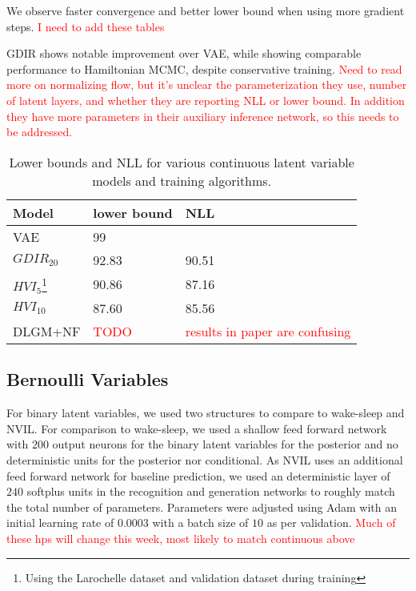 \documentclass{article} %
\newcommand{\alert}[1]{\textcolor{red}{#1}}
\begin{document}
We observe faster convergence and better lower bound when using more gradient steps. \alert{I need to add these tables}

GDIR shows notable improvement over VAE, while showing comparable performance to Hamiltonian MCMC, despite conservative training. \alert{Need to read more on normalizing flow, but it's unclear the parameterization they use, number of latent layers, and whether they are reporting NLL or lower bound. In addition they have more parameters in their auxiliary inference network, so this needs to be addressed.}

\begin{table}
\label{table:continuous}
\begin{tabular}{ | m{6em} | m{1cm}| m{5cm} | } 
\hline
Model & lower bound & NLL \\ 
\hline
\hline
VAE & 99 &  \\ 
\hline
$GDIR_{20}$ & 92.83 & 90.51 \\ 
\hline
\hline
$HVI_5$\footnote[1]{Using the Larochelle dataset and validation dataset during training} &  90.86 & 87.16 \\ 
$HVI_{10}$\footnote[1] & 87.60 & 85.56 \\ 
DLGM+NF & \alert{TODO} & \alert{results in paper are confusing} \\
\hline
\end{tabular}
\caption{Lower bounds and NLL for various continuous latent variable models and training algorithms.}
\end{table}

\subsection{Bernoulli Variables}
For binary latent variables, we used two structures to compare to wake-sleep and NVIL. For comparison to wake-sleep, we used a shallow feed forward network with $200$ output neurons for the binary latent variables for the posterior and no deterministic units for the posterior nor conditional. As NVIL uses an additional feed forward network for baseline prediction, we used an deterministic layer of $240$ softplus units in the recognition and generation networks to roughly match the total number of parameters. Parameters were adjusted using Adam \citep{kingma2014method} with an initial learning rate of \num{0.0003} with a batch size of $10$ as per validation. \alert{Much of these hps will change this week, most likely to match continuous above}
\end{document}
